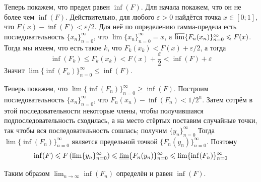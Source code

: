 \documentclass[12pt,a4paper]{article}
\begin{document}
\begin{enumproblem}
\begin{enumerate}
            Теперь покажем, что предел равен $\inf(F)$. Для начала покажем, что он не более чем $\inf(F)$. Действительно, для любого $\varepsilon > 0$ найдётся точка $x \in [0; 1]$, что $F(x) - \inf(F) < \varepsilon/2$. Для неё по определению гамма-предела есть последовательность $\{x_n\}_{n=0}^\infty$, что $\lim \{x_n\}_{n=0}^\infty = x$, а $\varlimsup \{F_n(x_n)\}_{n=0}^\infty \leqslant F(x)$. Тогда мы имеем, что есть такое $k$, что $F_k(x_k) < F(x) + \varepsilon/2$, а тогда
            \[\inf(F_k) \leqslant F_k(x_k) < F(x) + \frac{\varepsilon}{2} < \inf(F) + \varepsilon\]
            Значит $\lim \{\inf(F_n)\}_{n=0}^\infty \leqslant \inf(F)$.

            Теперь покажем, что $\lim \{\inf(F_n)\}_{n=0}^\infty \geqslant \inf(F)$. Построим последовательность $\{x_n\}_{n=0}^\infty$, что $F_n(x_n) - \inf(F_n) < 1/2^n$. Затем сотрём в этой последовательности некоторые члены, чтобы получившаяся подпоследовательность сходилась, а на место стёртых поставим случайные точки, так чтобы вся последовательность сошлась; получим $\{y_n\}_{n=0}^\infty$ Тогда $\lim \{\inf(F_n)\}_{n=0}^\infty$ является предельной точкой $\{F_n(y_n)\}_{n=0}^\infty$. Поэтому
            \[\inf(F) \leqslant F\left(\lim \{y_n\}_{n=0}^\infty\right) \leqslant \varliminf \{F_n(y_n)\}_{n=0}^\infty \leqslant \lim \{\inf(F_n)\}_{n=0}^\infty\]
            
            Таким образом $\lim_{n \to \infty} \inf(F_n)$ определён и равен $\inf(F)$.
        \end{enumerate}
    \end{enumproblem}
\end{document}
